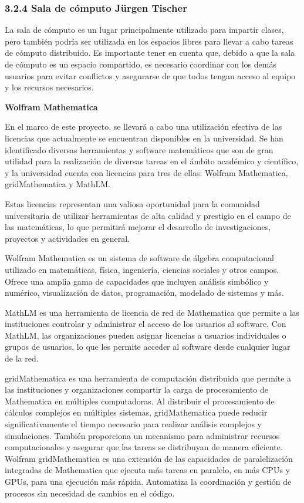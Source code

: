 \begin{spacing}{1.5}
  \subsubsection{3.2.4 Sala de cómputo Jürgen Tischer}

  La sala de cómputo es un lugar principalmente utilizado para impartir clases, pero también podría ser utilizada en los espacios libres para llevar a cabo tareas de cómputo distribuido. Es importante tener en cuenta que, debido a que la sala de cómputo es un espacio compartido, es necesario coordinar con los demás usuarios para evitar conflictos y asegurarse de que todos tengan acceso al equipo y los recursos necesarios.

  \textbf{Wolfram Mathematica}

  En el marco de este proyecto, se llevará a cabo una utilización efectiva de
  las licencias que actualmente se encuentran disponibles en la universidad. Se
  han identificado diversas herramientas y software matemáticos que son de gran
  utilidad para la realización de diversas tareas en el ámbito académico y
  científico, y la universidad cuenta con licencias para tres de ellas: Wolfram
  Mathematica, gridMathematica y MathLM.

  Estas licencias representan una valiosa oportunidad para la comunidad
  universitaria de utilizar herramientas de alta calidad y prestigio en el campo
  de las matemáticas, lo que permitirá mejorar el desarrollo de investigaciones,
  proyectos y actividades en general.

  Wolfram Mathematica es un sistema de software de álgebra computacional
  utilizado en matemáticas, física, ingeniería, ciencias sociales y otros campos.
  Ofrece una amplia gama de capacidades que incluyen análisis simbólico y
  numérico, visualización de datos, programación, modelado de sistemas y más.
  \cite{Wolfram-mathematica-1}

  MathLM es una herramienta de licencia de red de Mathematica que permite a
  las instituciones controlar y administrar el acceso de los usuarios al
  software. Con MathLM, las organizaciones pueden asignar licencias a usuarios
  individuales o grupos de usuarios, lo que les permite acceder al software desde
  cualquier lugar de la red. \cite{Wolfram-mathlm-1}

  gridMathematica es una herramienta de computación distribuida que permite a
  las instituciones y organizaciones compartir la carga de procesamiento de
  Mathematica en múltiples computadoras. Al distribuir el procesamiento de
  cálculos complejos en múltiples sistemas, gridMathematica puede reducir
  significativamente el tiempo necesario para realizar análisis complejos y
  simulaciones. También proporciona un mecanismo para administrar recursos
  computacionales y asegurar que las tareas se distribuyan de manera eficiente.
  Wolfram gridMathematica es una extensión de las capacidades de paralelización
  integradas de Mathematica que ejecuta más tareas en paralelo, en más CPUs y
  GPUs, para una ejecución más rápida. Automatiza la coordinación y gestión de
  procesos sin necesidad de cambios en el código. \cite{Wolfram-grid-1}


\end{spacing}
